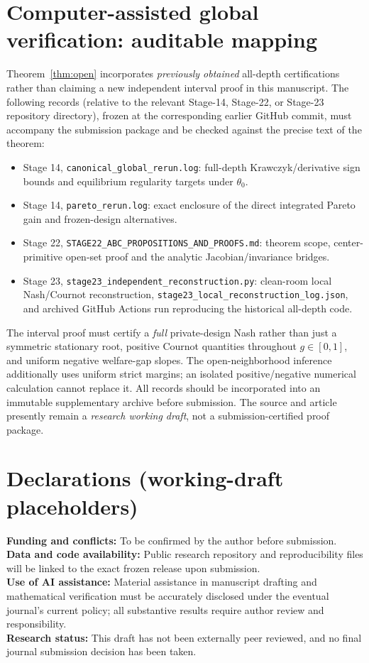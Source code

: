 \documentclass[11pt,a4paper]{article}
\theoremstyle{remark}\newtheorem{remark}[theorem]{Remark}
\begin{document}
\section{Computer-assisted global verification: auditable mapping}\label{app:cert}
Theorem~\ref{thm:open} incorporates \emph{previously obtained} all-depth certifications rather than claiming a new independent interval proof in this manuscript. The following records (relative to the relevant Stage-14, Stage-22, or Stage-23 repository directory), frozen at the corresponding earlier GitHub commit, must accompany the submission package and be checked against the precise text of the theorem:
\begin{itemize}
\item Stage 14, \texttt{canonical\_global\_rerun.log}: full-depth Krawczyk/derivative sign bounds and equilibrium regularity targets under $\theta_0$.
\item Stage 14, \texttt{pareto\_rerun.log}: exact enclosure of the direct integrated Pareto gain and frozen-design alternatives.
\item Stage 22, \texttt{STAGE22\_ABC\_PROPOSITIONS\_AND\_PROOFS.md}: theorem scope, center-primitive open-set proof and the analytic Jacobian/invariance bridges.
\item Stage 23, \texttt{stage23\_independent\_reconstruction.py}: clean-room local Nash/Cournot reconstruction, \texttt{stage23\_local\_reconstruction\_log.json}, and archived GitHub Actions run reproducing the historical all-depth code.
\end{itemize}
The interval proof must certify a \emph{full} private-design Nash rather than just a symmetric stationary root, positive Cournot quantities throughout $g\in[0,1]$, and uniform negative welfare-gap slopes. The open-neighborhood inference additionally uses uniform strict margins; an isolated positive/negative numerical calculation cannot replace it. All records should be incorporated into an immutable supplementary archive before submission. The source and article presently remain a \emph{research working draft}, not a submission-certified proof package.

\section*{Declarations (working-draft placeholders)}
\noindent\textbf{Funding and conflicts:} To be confirmed by the author before submission.\\
\textbf{Data and code availability:} Public research repository and reproducibility files will be linked to the exact frozen release upon submission.\\
\textbf{Use of AI assistance:} Material assistance in manuscript drafting and mathematical verification must be accurately disclosed under the eventual journal's current policy; all substantive results require author review and responsibility.\\
\textbf{Research status:} This draft has not been externally peer reviewed, and no final journal submission decision has been taken.
\end{document}
